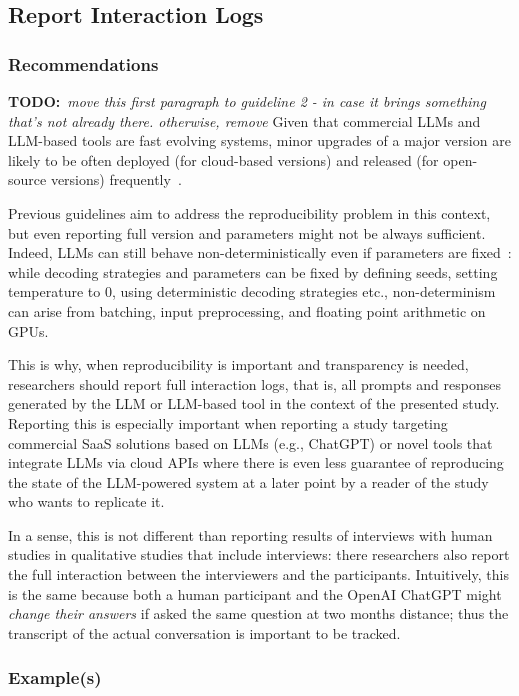 \documentclass[11pt]{article}
\newcommand{\todo}[1]{{\textbf{TODO:}\ \textit{#1}}} %
\begin{document}
\subsection{Report Interaction Logs}

\subsubsection{Recommendations}

\todo{move this first paragraph to guideline 2 - in case it brings something that's not already there. otherwise, remove}
Given that commercial LLMs and LLM-based tools are fast evolving systems, minor upgrades of a major version are likely to be often deployed (for cloud-based versions) and released (for open-source versions) frequently~\cite{DBLP:journals/corr/abs-2307-09009}. 

Previous guidelines aim to address the reproducibility problem in this context, but even reporting full version and parameters might not be always sufficient. Indeed, LLMs can still behave non-deterministically even if parameters are fixed~\cite{Chann2023}: while decoding strategies and parameters can be fixed by defining seeds, setting temperature to 0, using deterministic decoding strategies etc., non-determinism can arise from batching, input preprocessing, and floating point arithmetic on GPUs. 

This is why, when reproducibility is important and transparency is needed, researchers should report full interaction logs, that is, all prompts and responses generated by the LLM or LLM-based tool in the context of the presented study. 
Reporting this is especially important when reporting a study targeting commercial SaaS solutions based on LLMs (e.g., ChatGPT) or novel tools that integrate LLMs via cloud APIs where there is even less guarantee of reproducing the state of the LLM-powered system at a later point by a reader of the study who wants to replicate it. 

In a sense, this is not different than reporting results of interviews with human studies in qualitative studies that include interviews: there researchers also report the full interaction between the interviewers and the participants. Intuitively, this is the same because both a human participant and the OpenAI ChatGPT might {\em change their answers} if asked the same question at two months distance; thus the transcript of the actual conversation is important to be tracked.


\subsubsection{Example(s)}
\end{document}
